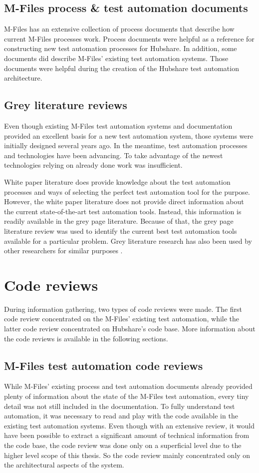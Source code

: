 \subsection{M-Files process \& test automation documents}
M-Files has an extensive collection of process documents that describe how current M-Files processes work. Process documents were helpful as a reference for constructing new test automation processes for Hubshare. In addition, some documents did describe M-Files' existing test automation systems. Those documents were helpful during the creation of the Hubshare test automation architecture.

\subsection{Grey literature reviews}
Even though existing M-Files test automation systems and documentation provided an excellent basis for a new test automation system, those systems were initially designed several years ago. In the meantime, test automation processes and technologies have been advancing. To take advantage of the newest technologies relying on already done work was insufficient.

White paper literature does provide knowledge about the test automation processes and ways of selecting the perfect test automation tool for the purpose. However, the white paper literature does not provide direct information about the current state-of-the-art test automation tools. Instead, this information is readily available in the grey page literature. Because of that, the grey page literature review was used to identify the current best test automation tools available for a particular problem. Grey literature research has also been used by other researchers for similar purposes \cite{paivi2017choosing,ricca2021web}.

\section{Code reviews}
During information gathering, two types of code reviews were made. The first code review concentrated on the M-Files' existing test automation, while the latter code review concentrated on Hubshare's code base. More information about the code reviews is available in the following sections.

\subsection{M-Files test automation code reviews}
While M-Files' existing process and test automation documents already provided plenty of information about the state of the M-Files test automation, every tiny detail was not still included in the documentation. To fully understand test automation, it was necessary to read and play with the code available in the existing test automation systems. Even though with an extensive review, it would have been possible to extract a significant amount of technical information from the code base, the code review was done only on a superficial level due to the higher level scope of this thesis. So the code review mainly concentrated only on the architectural aspects of the system.

